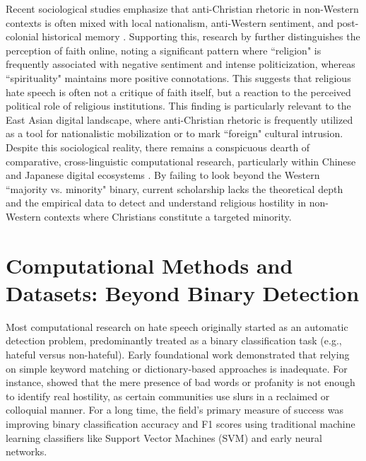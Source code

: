 \documentclass[../CLthesis.tex]{subfiles}
\begin{document}
Recent sociological studies emphasize that anti-Christian rhetoric in non-Western contexts is often mixed with local nationalism, anti-Western sentiment, and post-colonial historical memory \citep{yang2011religion, mullins2021religion}. Supporting this, research by \citet{schlag_153detecting_2025} further distinguishes the perception of faith online, noting a significant pattern where ``religion" is frequently associated with negative sentiment and intense politicization, whereas ``spirituality" maintains more positive connotations. This suggests that religious hate speech is often not a critique of faith itself, but a reaction to the perceived political role of religious institutions. This finding is particularly relevant to the East Asian digital landscape, where anti-Christian rhetoric is frequently utilized as a tool for nationalistic mobilization or to mark ``foreign" cultural intrusion. Despite this sociological reality, there remains a conspicuous dearth of comparative, cross-linguistic computational research, particularly within Chinese and Japanese digital ecosystems \citep{joshi2020state}. By failing to look beyond the Western ``majority vs. minority" binary, current scholarship lacks the theoretical depth and the empirical data to detect and understand religious hostility in non-Western contexts where Christians constitute a targeted minority.

\section{Computational Methods and Datasets: Beyond Binary Detection}

Most computational research on hate speech originally started as an automatic detection problem, predominantly treated as a binary classification task (e.g., hateful versus non-hateful). Early foundational work demonstrated that relying on simple keyword matching or dictionary-based approaches is inadequate. For instance, \citet{davidson_automated_2017} showed that the mere presence of bad words or profanity is not enough to identify real hostility, as certain communities use slurs in a reclaimed or colloquial manner. For a long time, the field's primary measure of success was improving binary classification accuracy and F1 scores using traditional machine learning classifiers like Support Vector Machines (SVM) and early neural networks.
\end{document}

